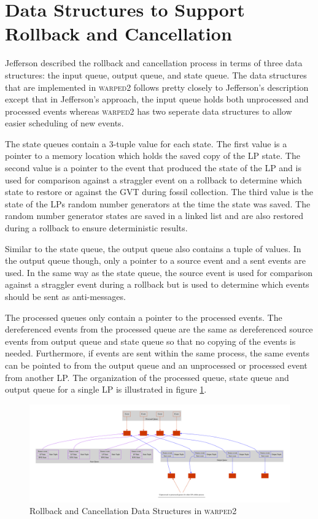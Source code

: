 \documentclass[11pt]{book}
\begin{document}
\section[Rollback \& Cancellation]{Data Structures to Support Rollback and Cancellation}

Jefferson\cite{jefferson-85} described the rollback and cancellation process in terms of three
data structures: the input queue, output queue, and state queue. The data structures that are
implemented in \textsc{warped2} follows pretty closely to Jefferson's description except that
in Jefferson's approach, the input queue holds both unprocessed and processed events whereas
\textsc{warped2} has two seperate data structures to allow easier scheduling of new events.

The state queues contain a 3-tuple value for each state. The first value is a pointer to a
memory location which holds the saved copy of the LP state. The second value is a pointer to the
event that produced the state of the LP and is used for comparison against a straggler event
on a rollback to determine which state to restore or against the GVT during fossil collection.
The third value is the state of the LPs random number generators at the time the state was saved.
The random number generator states are saved in a linked list and are also restored during a
rollback to ensure deterministic results.

Similar to the state queue, the output queue also contains a tuple of values. In the output
queue though, only a pointer to a source event and a sent events are used. In the same way
as the state queue, the source event is used for comparison against a straggler event during
a rollback but is used to determine which events should be sent as anti-messages.

The processed queues only contain a pointer to the processed events. The dereferenced events
from the processed queue are the same as dereferenced source events from output queue and state
queue so that no copying of the events is needed. Furthermore, if events are sent within the
same process, the same events can be pointed to from the output queue and an unprocessed or
processed event from another LP. The organization of the processed queue, state queue and output
queue for a single LP is illustrated in figure \ref{rollback_ds}.

\begin{figure}
    \centering
    \includegraphics[width=\textwidth,quiet]{figs/graphviz/rollback_ds.pdf}
    \caption{Rollback and Cancellation Data Structures in \textsc{warped2}}\label{rollback_ds}
\end{figure}
\end{document}

